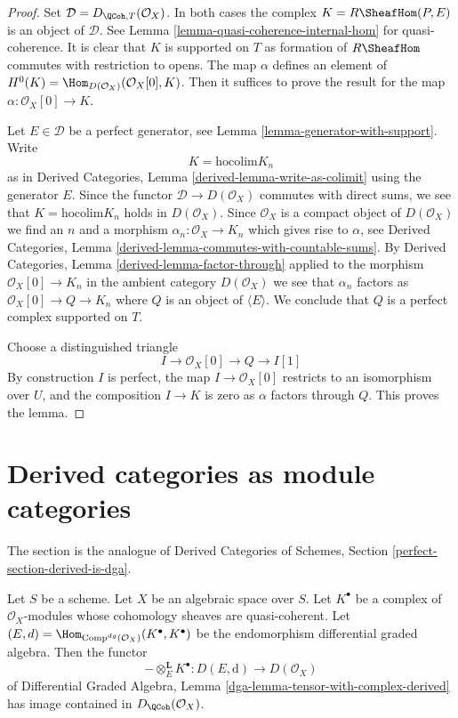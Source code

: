 \begin{proof}
Set $\mathcal{D} = D_{\QCoh, T}(\mathcal{O}_X)$. In both cases the complex
$K = R\SheafHom(P, E)$ is an object of $\mathcal{D}$. See
Lemma \ref{lemma-quasi-coherence-internal-hom} for quasi-coherence.
It is clear that $K$ is supported on $T$ as formation of $R\SheafHom$
commutes with restriction to opens.
The map $\alpha$ defines an element of
$H^0(K) = \Hom_{D(\mathcal{O}_X)}(\mathcal{O}_X[0], K)$.
Then it suffices to prove the result for the map
$\alpha : \mathcal{O}_X[0] \to K$.

\medskip\noindent
Let $E \in \mathcal{D}$ be a perfect generator, see
Lemma \ref{lemma-generator-with-support}. Write
$$
K = \text{hocolim} K_n
$$
as in Derived Categories, Lemma \ref{derived-lemma-write-as-colimit}
using the generator $E$. Since the functor $\mathcal{D} \to D(\mathcal{O}_X)$
commutes with direct sums, we see that $K = \text{hocolim} K_n$
holds in $D(\mathcal{O}_X)$. Since $\mathcal{O}_X$ is a compact
object of $D(\mathcal{O}_X)$ we find an $n$ and a morphism
$\alpha_n : \mathcal{O}_X \to K_n$ which gives rise to $\alpha$, see
Derived Categories, Lemma \ref{derived-lemma-commutes-with-countable-sums}.
By Derived Categories, Lemma \ref{derived-lemma-factor-through}
applied to the morphism $\mathcal{O}_X[0] \to K_n$ in the ambient
category $D(\mathcal{O}_X)$ we see that $\alpha_n$ factors as
$\mathcal{O}_X[0] \to Q \to K_n$ where $Q$ is an object
of $\langle E \rangle$. We conclude that $Q$ is a perfect complex
supported on $T$.

\medskip\noindent
Choose a distinguished triangle
$$
I \to \mathcal{O}_X[0] \to Q \to I[1]
$$
By construction $I$ is perfect, the map $I \to \mathcal{O}_X[0]$
restricts to an isomorphism over $U$, and the composition
$I \to K$ is zero as $\alpha$ factors through $Q$.
This proves the lemma.
\end{proof}










\section{Derived categories as module categories}
\label{section-derived-is-dga}

\noindent
The section is the analogue of
Derived Categories of Schemes, Section \ref{perfect-section-derived-is-dga}.

\begin{lemma}
\label{lemma-tensor-with-QCoh-complex}
Let $S$ be a scheme. Let $X$ be an algebraic space over $S$. Let $K^\bullet$
be a complex of $\mathcal{O}_X$-modules whose cohomology sheaves are
quasi-coherent. Let
$(E, d) = \Hom_{\text{Comp}^{dg}(\mathcal{O}_X)}(K^\bullet, K^\bullet)$
be the endomorphism differential graded algebra. Then the functor
$$
- \otimes_E^\mathbf{L} K^\bullet :
D(E, \text{d}) \longrightarrow D(\mathcal{O}_X)
$$
of
Differential Graded Algebra, Lemma
\ref{dga-lemma-tensor-with-complex-derived}
has image contained in $D_\QCoh(\mathcal{O}_X)$.
\end{lemma}


